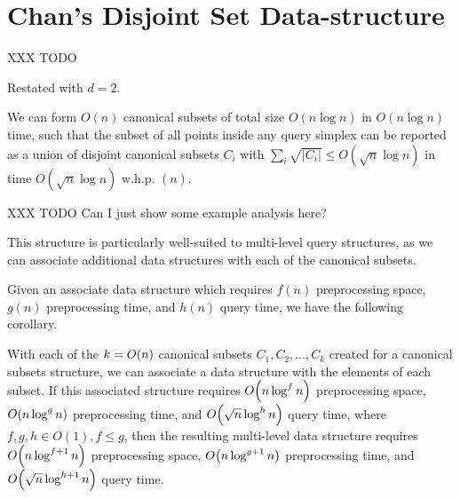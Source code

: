 \section{Chan's Disjoint Set Data-structure}
\label{:prelim:chan}

XXX TODO

Restated with $d=2$.

\begin{theorem}
\label{th:chan}
We can form $O(n)$ canonical subsets of total size $O(n \log{n})$ in $O(n \log{n})$ time, such that the subset of all points inside any query simplex can be reported as a union of disjoint canonical subsets $C_i$ with $\sum_i{\sqrt{|C_i|}} \leq O(\sqrt{n}\log{n})$ in time $O(\sqrt{n}\log{n})$ w.h.p. $(n)$.
\end{theorem}

XXX TODO Can I just show some example analysis here?

This structure is particularly well-suited to multi-level query structures, as we can associate additional data structures with each of the canonical subsets.

Given an associate data structure which requires $f(n)$ preprocessing space, $g(n)$ preprocessing time, and $h(n)$ query time, we have the following corollary.

\begin{corollary}
\label{cor:chan}
With each of the $k = O\!\left(n\right)$ canonical subsets $C_1, C_2, \ldots, C_k$ created for a canonical subsets structure, we can associate a data structure with the elements of each subset. If this associated structure requires $O\!\left(n\log^f{n}\right)$ preprocessing space, $O\!\left(n \log^g{n}\right)$ preprocessing time, and $O\!\left(\sqrt{n}\log^h{n}\right)$ query time, where $f, g, h \in O(1), f \leq g$, then the resulting multi-level data structure requires $O\!\left(n\log^{f+1}{n}\right)$ preprocessing space, $O\!\left(n\log^{g+1}{n}\right)$ preprocessing time, and $O\!\left(\sqrt{n}\log^{h+1}{n}\right)$ query time.
\end{corollary}


